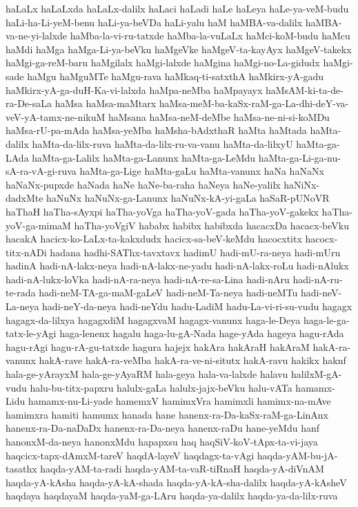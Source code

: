{haLaLx
haLaLxda
haLaLx-dalilx
haLaci
haLadi
haLe
haLeya
haLe-ya-veM-budu
haLi-ha-Li-yeM-benu
haLi-ya-beVDa
haLi-yalu
haM
haMBA-va-dalilx
haMBA-va-ne-yi-lalxde
haMba-la-vi-ru-tatxde
haMba-la-vuLaLx
haMci-koM-budu
haMcu
haMdi
haMga
haMga-Li-ya-beVku
haMgeVke
haMgeV-ta-kayAyx
haMgeV-takekx
haMgi-ga-reM-baru
haMgilalx
haMgi-lalxde
haMgina
haMgi-no-La-gidudx
haMgi-sade
haMgu
haMguMTe
haMgu-rava
haMkaq-ti-satxthA
haMkirx-yA-gadu
haMkirx-yA-ga-duH-Ka-vi-lalxda
haMpa-neMba
haMpayayx
haMsAM-ki-ta-de-ra-De-saLa
haMsa
haMsa-maMtarx
haMsa-meM-ba-kaSx-raM-ga-La-dhi-deY-va-veV-yA-tamx-ne-nikuM
haMsana
haMsa-neM-deMbe
haMsa-ne-ni-si-koMDu
haMsa-rU-pa-mAda
haMsa-yeMba
haMsha-bAdxthaR
haMta
haMtada
haMta-dalilx
haMta-da-lilx-ruva
haMta-da-lilx-ru-va-vanu
haMta-da-lilxyU
haMta-ga-LAda
haMta-ga-Lalilx
haMta-ga-Lanunx
haMta-ga-LeMdu
haMta-ga-Li-ga-nu-sA-ra-vA-gi-ruva
haMta-ga-Lige
haMta-gaLu
haMta-vanunx
haNa
haNaNx
haNaNx-pupxde
haNada
haNe
haNe-ba-raha
haNeya
haNe-yalilx
haNiNx-dadxMte
haNuNx
haNuNx-ga-Lanunx
haNuNx-kA-yi-gaLa
haSaR-pUNoVR
haThaH
haTha-sAyxpi
haTha-yoVga
haTha-yoV-gada
haTha-yoV-gakekx
haTha-yoV-ga-mimaM
haTha-yoVgiV
hababx
habibx
habibxda
hacacxDa
hacacx-beVku
hacakA
hacicx-ko-LaLx-ta-kakxdudx
hacicx-sa-beV-keMdu
hacocxtitx
hacocx-titx-nADi
hadana
hadhi-SAThx-tavxtavx
hadimU
hadi-mU-ra-neya
hadi-mUru
hadinA
hadi-nA-lakx-neya
hadi-nA-lakx-ne-yadu
hadi-nA-lakx-roLu
hadi-nAlukx
hadi-nA-lukx-loVka
hadi-nA-ra-neya
hadi-nA-re-sa-Lina
hadi-nAru
hadi-nA-ru-te-rada
hadi-neM-TA-ga-maM-gaLeV
hadi-neM-Ta-neya
hadi-neMTu
hadi-neV-La-neya
hadi-neY-da-neya
hadi-neYdu
hadu-LadiM
hadu-La-vi-ri-su-vudu
hagagx
hagagx-da-lilxya
hagagxdiM
hagagxvaM
hagagx-vanunx
haga-le-Deya
haga-le-ga-tatx-le-yAgi
haga-lenenx
hagalu
haga-lu-gA-Nada
hage-yAda
hageya
hagu-rAda
hagu-rAgi
hagu-rA-gu-tatxde
hagura
hajejx
hakAra
hakAraH
hakAraM
hakA-ra-vanunx
hakA-rave
hakA-ra-veMba
hakA-ra-ve-ni-situtx
hakA-ravu
hakikx
haknf
hala-ge-yArayxM
hala-ge-yAyaRM
hala-geya
hala-va-lalxde
halavu
halilxM-gA-vudu
halu-bu-titx-papxru
halulx-gaLa
halulx-jajx-beVku
halu-vATa
hamamx-Lidu
hamamx-nu-Li-yade
hamemxV
hamimxVra
hamimxli
hamimx-na-mAve
hamimxra
hamiti
hamumx
hanada
hane
hanenx-ra-Da-kaSx-raM-ga-LinAnx
hanenx-ra-Da-naDaDx
hanenx-ra-Da-neya
hanenx-raDu
hane-yeMdu
hanf
hanonxM-da-neya
hanonxMdu
hapapxsu
haq
haqSiV-koV-tApx-ta-vi-jaya
haqcicx-tapx-dAmxM-tareV
haqdA-layeV
haqdagx-ta-vAgi
haqda-yAM-bu-jA-tasathx
haqda-yAM-ta-radi
haqda-yAM-ta-vaR-tiRnaH
haqda-yA-diVnAM
haqda-yA-kAsha
haqda-yA-kA-shada
haqda-yA-kA-sha-dalilx
haqda-yA-kAsheV
haqdaya
haqdayaM
haqda-yaM-ga-LAru
haqda-ya-dalilx
haqda-ya-da-lilx-ruva
}
